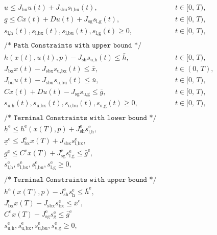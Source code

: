 \documentclass{article}
\newcommand{\ind}[1]{_{\textrm{#1}}}
\newcommand{\terminal}{^{\textrm{e}}}
\newcommand{\lowerh}{\ind{l,h}}
\newcommand{\lowerbx}{\ind{l,bx}}
\newcommand{\lowerbu}{\ind{l,bu}}
\newcommand{\lowerg}{\ind{l,g}}
\newcommand{\upperh}{\ind{u,h}}
\newcommand{\upperbx}{\ind{u,bx}}
\newcommand{\upperbu}{\ind{u,bu}}
\newcommand{\upperg}{\ind{u,g}}
\newcommand{\mathComment}[1]{\texttt{/* #1 */}}
\begin{document}
\begin{align*}
	&&&\underline{u} \leq J_{\textrm{bu}} u(t) + J_{\textrm{sbu}} s\lowerbu(t), &&\quad t \in [0,\,T),\\
	&&&\underline{g} \leq Cx(t) + Du(t) + J_{\textrm{sg}} s\lowerg(t), &&\quad t \in [0,\,T), \\
	&&& s\lowerh (t), s\lowerbx(t), s\lowerbu(t), s\lowerg(t) \geq 0, &&\quad t \in [0,\,T), \\
	&&& && \\[-1em]
	&&&\mathComment{Path Constraints with upper bound}\\
	&&& h(x(t), u(t), p) - J_{\textrm{sh}} s\upperh(t) \leq \bar{h}, &&\quad t \in [0,\,T),\\
	&&& J_{\textrm{bx}} x(t) - J_{\textrm{sbx}} s\upperbx(t) \leq \bar{x}, &&\quad t \in (0,\,T),\\
	&&& J_{\textrm{bu}} u(t) - J_{\textrm{sbu}} s\upperbu(t)\leq \bar{u}, &&\quad t \in [0,\,T),\\
	&&&Cx(t) + Du(t) - J_{\textrm{sg}} s\upperg \leq \bar{g}, &&\quad t \in [0,\,T), \\
	&&& s\upperh(t), s\upperbx(t), s\upperbu(t), s\upperg(t) \geq 0, &&\quad t \in [0,\,T), \\
	&&& && \\[-1em]
	&&&\mathComment{Terminal Constraints with lower bound}\\
	&&&\underline{h}\terminal \leq h\terminal(x(T), p) + J\ind{sh}\terminal s\lowerh\terminal, &&\\
	&&&\underline{x}\terminal \leq J_{\textrm{bx}}\terminal x(T) + J\ind{sbx} s\lowerbx\terminal, &&\\ %
	&&&\underline{g}\terminal \leq C\terminal x(T) + J\ind{sg}\terminal s\lowerg\terminal \leq \bar{g}\terminal, && \\
	&&& s\lowerh\terminal, s\lowerbx\terminal, s\lowerbu\terminal, s\lowerg\terminal \geq 0, \\
	&&& && \\[-1em]
	&&&\mathComment{Terminal Constraints with upper bound}\\
	&&& h\terminal(x(T), p) - J\ind{sh}\terminal s\ind{h}\terminal \leq \bar{h}\terminal, &&\\
	&&& J_{\textrm{bx}}\terminal x(T) - J\ind{sbx} s\ind{bx}\terminal \leq \bar{x}^{e}, &&\\ %
	&&& C\terminal x(T) - J\ind{sg}\terminal s\ind{g}\terminal \leq \bar{g}\terminal \\
	&&& s\upperh\terminal, s\upperbx\terminal, s\upperbu\terminal, s\upperg\terminal \geq 0,
\end{align*}
\end{document}
